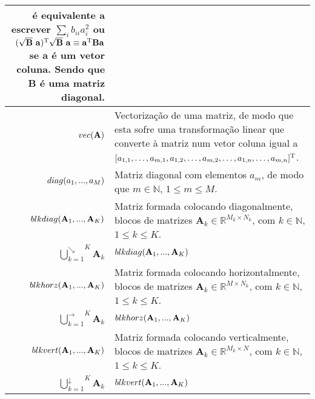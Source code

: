 \begin{tabular}{r | p{.70\linewidth} }
é equivalente a escrever $\sum_i b_{ii} a_i^2$ ou $(\sqrt{\mathbf{B}}~\mathbf{a})^{\mathrm{T}}\sqrt{\mathbf{B}}~\mathbf{a} \equiv \mathbf{a}^{\mathrm{T}}\mathbf{B}\mathbf{a}$ 
se $\mathbf{a}$ é um vetor coluna. Sendo que $\mathbf{B}$ é uma matriz diagonal.\\
\hline
$vec(\mathbf{A})$ & Vectorização de uma matriz, de modo que esta sofre uma transformação linear 
que converte à matriz num vetor coluna igual a
$[ a_{1,1},\ldots ,a_{m,1},a_{1,2},\ldots ,a_{m,2},\ldots ,a_{1,n},\ldots ,a_{m,n}]^{\mathrm{T}} $.\\
\hline
$diag(a_1,...,a_M)$ & Matriz diagonal com elementos $a_m$, de modo que $m\in \mathbb{N}$, $1 \leq m \leq M$.\\
\hline
$blkdiag(\mathbf{A}_1,...,\mathbf{A}_K)$& Matriz formada colocando diagonalmente,   blocos de matrizes $\mathbf{A}_k \in \mathbb{R}^{M_k \times N_k}$, com $k\in \mathbb{N}$, $1 \leq k \leq K$.\\
${\bigcup \limits_{k=1}^{\searrow}}^{K}{\mathbf{A}_k}$ & $blkdiag(\mathbf{A}_1,...,\mathbf{A}_K)$ \\
$blkhorz(\mathbf{A}_1,...,\mathbf{A}_K)$ & Matriz formada colocando horizontalmente, blocos de matrizes $\mathbf{A}_k \in \mathbb{R}^{M   \times N_k}$, com $k\in \mathbb{N}$, $1 \leq k \leq K$.\\
${\bigcup \limits_{k=1}^{\rightarrow}}^{K}{\mathbf{A}_k}$ & $blkhorz(\mathbf{A}_1,...,\mathbf{A}_K)$ \\
$blkvert(\mathbf{A}_1,...,\mathbf{A}_K)$ & Matriz formada colocando verticalmente,   blocos de matrizes $\mathbf{A}_k \in \mathbb{R}^{M_k \times N  }$, com $k\in \mathbb{N}$, $1 \leq k \leq K$.\\
${\bigcup \limits_{k=1}^{\downarrow}}^{K}{\mathbf{A}_k}$ & $blkvert(\mathbf{A}_1,...,\mathbf{A}_K)$ \\
\end{tabular}

\onehalfspacing
